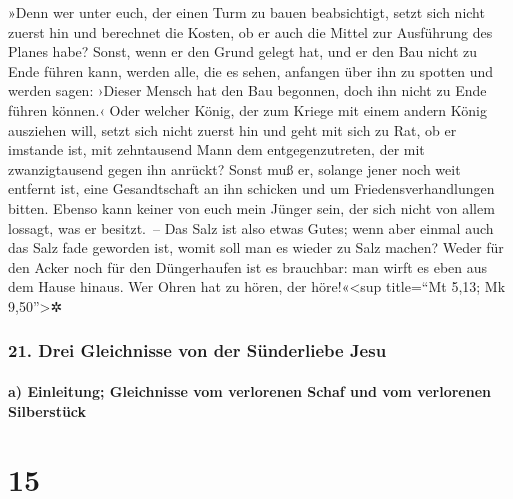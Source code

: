  »Denn wer unter euch, der einen Turm zu bauen
beabsichtigt, setzt sich nicht zuerst hin und berechnet die Kosten, ob
er auch die Mittel zur Ausführung des Planes habe? 
Sonst, wenn er den Grund gelegt hat, und er den Bau nicht zu Ende führen
kann, werden alle, die es sehen, anfangen über ihn zu spotten
 und werden sagen: ›Dieser Mensch hat den Bau begonnen,
doch ihn nicht zu Ende führen können.‹  Oder welcher
König, der zum Kriege mit einem andern König ausziehen will, setzt sich
nicht zuerst hin und geht mit sich zu Rat, ob er imstande ist, mit
zehntausend Mann dem entgegenzutreten, der mit zwanzigtausend gegen ihn
anrückt?  Sonst muß er, solange jener noch weit entfernt
ist, eine Gesandtschaft an ihn schicken und um Friedensverhandlungen
bitten.  Ebenso kann keiner von euch mein Jünger sein,
der sich nicht von allem lossagt, was er besitzt.~--  Das
Salz ist also etwas Gutes; wenn aber einmal auch das Salz fade geworden
ist, womit soll man es wieder zu Salz machen?  Weder für
den Acker noch für den Düngerhaufen ist es brauchbar: man wirft es eben
aus dem Hause hinaus. Wer Ohren hat zu hören, der höre!«\textless sup
title=``Mt 5,13; Mk 9,50''\textgreater✲

\hypertarget{drei-gleichnisse-von-der-suxfcnderliebe-jesu}{%
\subsubsection{21. Drei Gleichnisse von der Sünderliebe
Jesu}\label{drei-gleichnisse-von-der-suxfcnderliebe-jesu}}

\hypertarget{a-einleitung-gleichnisse-vom-verlorenen-schaf-und-vom-verlorenen-silberstuxfcck}{%
\paragraph{a) Einleitung; Gleichnisse vom verlorenen Schaf und vom
verlorenen
Silberstück}\label{a-einleitung-gleichnisse-vom-verlorenen-schaf-und-vom-verlorenen-silberstuxfcck}}

\hypertarget{section-14}{%
\section{15}\label{section-14}}

